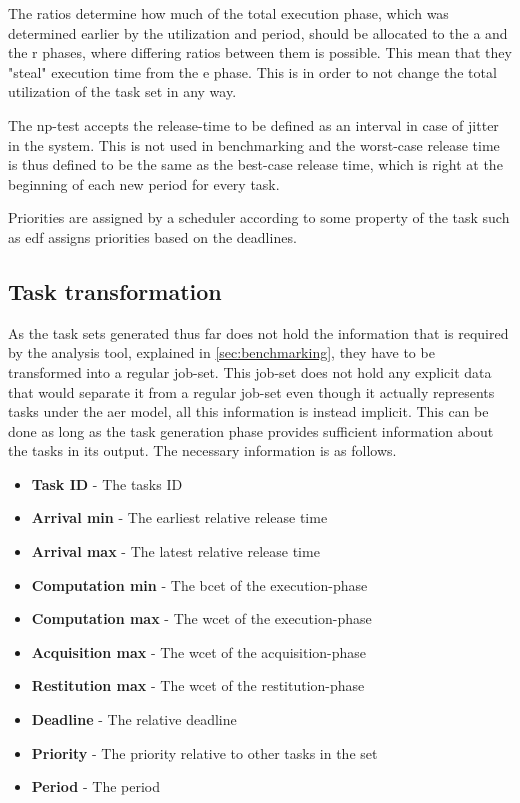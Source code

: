 \documentclass{kththesis}
\begin{document}
The ratios determine how much of the total execution phase, which was determined earlier by the
utilization and period, should be allocated to the \acrshort{a} and the \acrshort{r} phases, where
differing ratios between them is possible. This mean that they "steal" execution time from the
\acrshort{e} phase. This is in order to not change the total utilization of the task set in any way.

The \acrshort{np}-test accepts the release-time to be defined as an interval in case of jitter in
the system. This is not used in benchmarking and the worst-case release time is thus defined to be
the same as the best-case release time, which is right at the beginning of each new period for every
task.

Priorities are assigned by a scheduler according to some property of the task such as \acrshort{edf}
assigns priorities based on the deadlines.


\subsection{Task transformation} \label{sub:task_transformation}

As the task sets generated thus far does not hold the information that is required by the analysis
tool, explained in \ref{sec:benchmarking}, they have to be transformed into a regular job-set. This
job-set does not hold any explicit data that would separate it from a regular job-set even though it
actually represents tasks under the \acrshort{aer} model, all this information is instead implicit.
This can be done as long as the task generation phase provides sufficient information about the
tasks in its output. The necessary information is as follows.

\begin{itemize}
    \item \textbf{Task ID} - The tasks ID
    \item \textbf{Arrival min} - The earliest relative release time
    \item \textbf{Arrival max} - The latest relative release time
    \item \textbf{Computation min} - The \acrshort{bcet} of the execution-phase
    \item \textbf{Computation max} - The \acrshort{wcet} of the execution-phase
    \item \textbf{Acquisition max} - The \acrshort{wcet} of the acquisition-phase
    \item \textbf{Restitution max} - The \acrshort{wcet} of the restitution-phase
    \item \textbf{Deadline} - The relative deadline
    \item \textbf{Priority} - The priority relative to other tasks in the set
    \item \textbf{Period} - The period 
\end{itemize}
\end{document}
